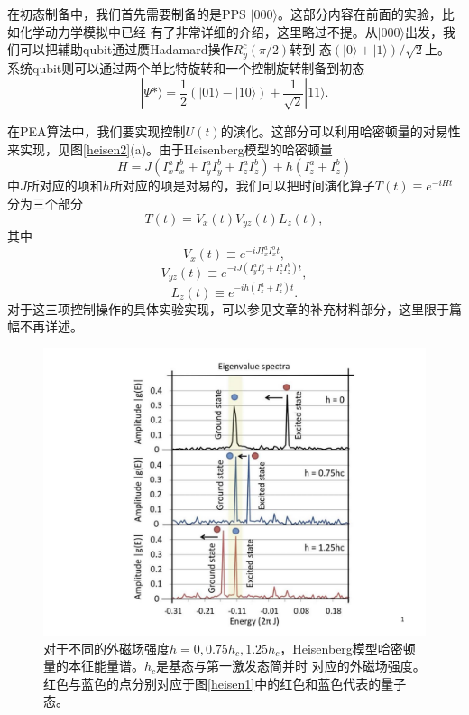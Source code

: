在初态制备中，我们首先需要制备的是PPS $|000\rangle$。这部分内容在前面的实验，比如化学动力学模拟中已经
有了非常详细的介绍，这里略过不提。从$|000\rangle$出发，我们可以把辅助qubit通过赝Hadamard操作$R_y^c(\pi/2)$转到
态$(|0\rangle+|1\rangle)/\sqrt{2}$上。系统qubit则可以通过两个单比特旋转和一个控制旋转制备到初态
\begin{equation}
|\Psi\ast\rangle = \frac{1}{2}(|01\rangle-|10\rangle) +\frac{1}{\sqrt{2}}|11\rangle.
\end{equation}

在PEA算法中，我们要实现控制$U(t)$的演化。这部分可以利用哈密顿量的对易性来实现，见图\ref{heisen2}(a)。由于Heisenberg模型的哈密顿量
 \begin{equation}
H = J(I_x^aI_x^b+I_y^aI_y^b+I_z^aI_z^b)+h(I_z^a+I_z^b)
\end{equation}
中$J$所对应的项和$h$所对应的项是对易的，我们可以把时间演化算子$T(t)\equiv e^{-iHt}$分为三个部分
 \begin{equation}
T(t) = V_x(t) V_{yz}(t) L_z(t),
\end{equation}
其中
 \begin{equation}
V_x(t) \equiv e^{-iJI_x^aI_x^bt},
\end{equation}
 \begin{equation}
V_{yz}(t) \equiv e^{-iJ(I_y^aI_y^b+I_z^aI_z^b)t},
\end{equation}
 \begin{equation}
L_z(t) \equiv e^{-ih(I_z^a+I_z^b)t}.
\end{equation}
对于这三项控制操作的具体实验实现，可以参见文章\cite{yexiao}的补充材料部分，这里限于篇幅不再详述。

 \begin{figure}[htbp]
            \begin{center}
              \includegraphics[width= 0.8\columnwidth]{figures/heisen3.pdf}
              \caption{对于不同的外磁场强度$h = 0,0.75h_c,1.25h_c$，Heisenberg模型哈密顿量的本征能量谱。$h_c$是基态与第一激发态简并时
              对应的外磁场强度。红色与蓝色的点分别对应于图\ref{heisen1}中的红色和蓝色代表的量子态。}\label{heisen3}
            \end{center}
 \end{figure}

